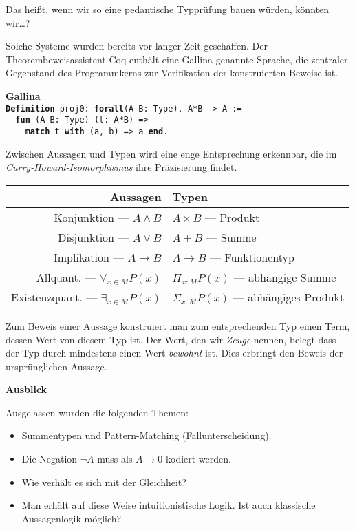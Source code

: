 \documentclass[9pt]{beamer}
\newcommand{\strong}[1]{\textsf{\textbf{#1}}}
\newcommand{\kw}[1]{\textbf{#1}}
\begin{document}
\begin{frame}
Das heißt, wenn wir so eine pedantische Typprüfung bauen würden,
könnten wir\ldots?\pause

\vspace{1em}
Solche Systeme wurden bereits vor langer Zeit geschaffen. Der
Theorembeweisassistent Coq enthält eine Gallina genannte Sprache,
die zentraler Gegenstand des Programmkerns zur Verifikation der
konstruierten Beweise ist.\pause

\vspace{1em}
\strong{Gallina}\\[4pt]
\texttt{\kw{Definition} proj0: \kw{forall}(A B: Type), A*B -> A :=\\
\ \ \kw{fun} (A B: Type) (t: A*B) =>\\
\ \ \ \ \kw{match} t \kw{with} (a, b) => a \kw{end}.}
\end{frame}

\begin{frame}
Zwischen Aussagen und Typen wird eine enge Entsprechung erkennbar,
die im \emph{Curry-Howard-Isomorphismus} ihre Präzisierung findet.\pause
\begin{table}
\begin{tabular}{rl}
\toprule
\strong{Aussagen} & \strong{Typen}\\
\midrule
Konjunktion --- $A\land B$ & $A\times B$ --- Produkt\\
Disjunktion --- $A\lor B$ & $A+B$ --- Summe\\
Implikation --- $A\to B$ & $A\to B$ --- Funktionentyp\\
Allquant. --- $\forall_{x\in M} P(x)$ & $\Pi_{x\colon M} P(x)$ --- abhängige Summe\\
Existenzquant. --- $\exists_{x\in M} P(x)$ & $\Sigma_{x\colon M}P(x)$ --- abhängiges Produkt\\
\bottomrule
\end{tabular}
\end{table}\pause

Zum Beweis einer Aussage konstruiert man zum entsprechenden Typ
einen Term, dessen Wert von diesem Typ ist. Der Wert, den wir
\emph{Zeuge} nennen, belegt dass der Typ durch mindestens
einen Wert \emph{bewohnt} ist. Dies erbringt den Beweis der
ursprünglichen Aussage.
\end{frame}

\begin{frame}
\strong{Ausblick}

\vspace{1em}
Ausgelassen wurden die folgenden Themen:
\begin{itemize}
\item Summentypen und Pattern-Matching (Fallunterscheidung).
\item Die Negation $\neg A$ muss als $A\to 0$ kodiert werden.
\item Wie verhält es sich mit der Gleichheit?
\item Man erhält auf diese Weise intuitionistische Logik.
  Ist auch klassische Aussagenlogik möglich?
\end{itemize}
\end{frame}
\end{document}
